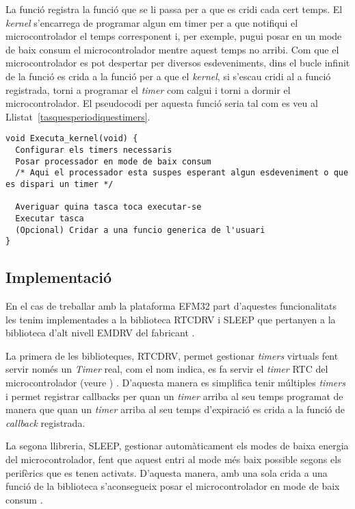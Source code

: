 La funció  registra la funció que se li passa per a que es cridi cada cert temps. El {\em kernel} s'encarrega de programar algun {em timer} per a que notifiqui el microcontrolador el temps corresponent i, per exemple, pugui posar en un mode de baix consum el microcontrolador mentre aquest temps no arribi.
Com que el microcontrolador es pot despertar per diversos esdeveniments, dins el bucle infinit de la funció  es crida a la funció per a que el {\em kernel}, si s'escau cridi al a funció registrada, torni a programar el {\em timer} com calgui i torni a dormir el microcontrolador. El pseudocodi per aquesta funció seria tal com es veu al Llistat~\ref{tasquesperiodiquestimers}.

\begin{lstlisting}[style=customc,caption={Estructura bàsica de la funció Executa\_kernel()},label=tasquesperiodiquestimers]
void Executa_kernel(void) {
  Configurar els timers necessaris
  Posar processador en mode de baix consum
  /* Aqui el processador esta suspes esperant algun esdeveniment o que es dispari un timer */

  Averiguar quina tasca toca executar-se
  Executar tasca 
  (Opcional) Cridar a una funcio generica de l'usuari
}
\end{lstlisting}

\subsection{Implementació}
En el cas de treballar amb la plataforma EFM32 part d'aquestes funcionalitats les tenim implementades a la biblioteca RTCDRV i SLEEP que pertanyen a la biblioteca d'alt nivell EMDRV del fabricant \cite{EMDRV}. 

La primera de les biblioteques, RTCDRV, permet gestionar {\em timers} virtuals fent servir només un {\em Timer} real, com el nom indica, es fa servir el {\em timer} RTC del microcontrolador (veure ) \cite{RTCDRV}. D'aquesta manera es simplifica tenir múltiples {\em timers} i permet registrar \glspl{callback} per quan un {\em timer} arriba al seu temps programat de manera que quan un {\em timer} arriba al seu temps d'expiració es crida a la funció de {\em callback} registrada. 

La segona llibreria, SLEEP, gestionar automàticament els modes de baixa energia del microcontrolador, fent que aquest entri al mode més baix possible segons els perifèrics que es tenen activats. D'aquesta manera, amb una sola crida a una funció de la biblioteca s'aconsegueix posar el microcontrolador en mode de baix consum \cite{SLEEPDRV}.

